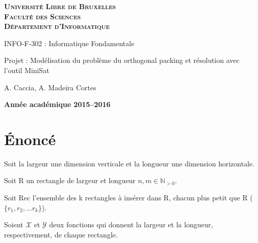 \documentclass[a4paper,10pt]{article}
\begin{document}
\begin{titlepage}
    \begin{center}
        \textbf{\textsc{Université Libre de Bruxelles}}\\
        \textbf{\textsc{Faculté des Sciences}}\\
        \textbf{\textsc{Département d'Informatique}}

        \vfill{}
        \vfill{}

        \begin{center}
            {\Huge INFO-F-302 : Informatique Fondamentale}
        \end{center}

        {\Huge \par}

        \begin{center}
            {\LARGE Projet : Modélisation du problème du orthogonal packing et résolution avec l’outil MiniSat}
        \end{center}

        {\Huge \par}

        \begin{center}
            {\large A. Caccia, A. Madeira Cortes}
        \end{center}

        {\Huge \par}
        \vfill{}
        \vfill{}

        {\large\par}
        \vfill{}
        \vfill{}

        \textbf{Année académique 2015--2016}
    \end{center}
\end{titlepage}

\tableofcontents
\newpage

\section{Énoncé}

Soit la largeur une dimension verticale et la longueur une dimension horizontale.

Soit R un rectangle de largeur et longueur $n, m \in \mathbb{N}_{>0}$.

Soit Rec l'ensemble des k rectangles à insérer dans R, chacun plus petit que R ( $\{ r_1, r_2, \ldots r_k \}$).

Soient $\mathcal{X}$ et $\mathcal{Y}$ deux fonctions qui donnent la largeur et la longueur, respectivement, de chaque rectangle.
\end{document}
